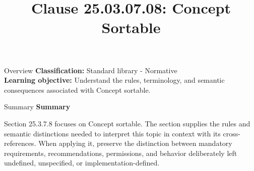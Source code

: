 \documentclass[10pt,letterpaper]{article}
\title{Clause 25.03.07.08: Concept Sortable}
\author{}
\date{}
\begin{document}
\maketitle
\begin{CornellOverviewBox}{Overview}
\textbf{Classification:} Standard library - Normative\\[2pt]
\textbf{Learning objective:} Understand the rules, terminology, and semantic consequences associated with Concept sortable.
\end{CornellOverviewBox}\begin{CornellSummaryBox}{Summary}
{\sffamily\bfseries\color{Accent} Summary}\par\vspace{3pt}Section 25.3.7.8 focuses on Concept sortable. The section supplies the rules and semantic distinctions needed to interpret this topic in context with its cross-references. When applying it, preserve the distinction between mandatory requirements, recommendations, permissions, and behavior deliberately left undefined, unspecified, or implementation-defined.
\end{CornellSummaryBox}
\end{document}
